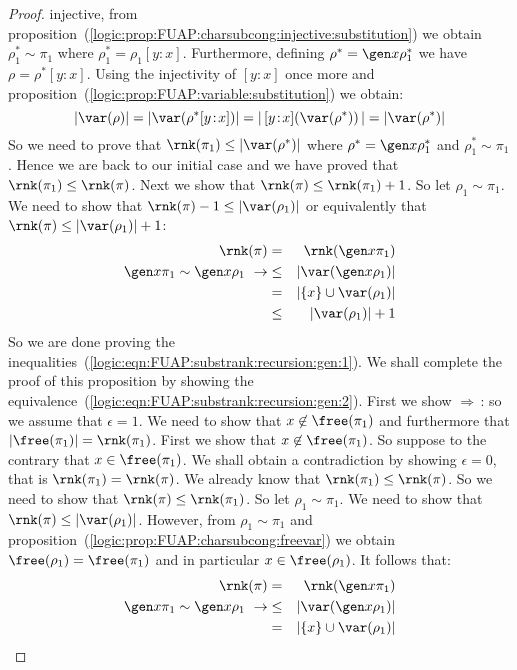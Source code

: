 \begin{proof}
injective, from
proposition~(\ref{logic:prop:FUAP:charsubcong:injective:substitution})
we obtain $\rho_{1}^{*}\sim\pi_{1}$ where
$\rho_{1}^{*}=\rho_{1}[y\!:\!x]$. Furthermore, defining
$\rho^{*}=\gen x\rho_{1}^{*}$ we have $\rho=\rho^{*}[y\!:\!x]$.
Using the injectivity of $[y\!:\!x]$ once more and
proposition~(\ref{logic:prop:FUAP:variable:substitution}) we obtain:
    \[
    |\var(\rho)|=|\var(\rho^{*}[y\!:\!x])|=
    |\,[y\!:\!x](\var(\rho^{*}))\,|=|\var(\rho^{*})|
    \]
So we need to prove that $\rnk(\pi_{1})\leq|\var(\rho^{*})|$ where
$\rho^{*}=\gen x\rho_{1}^{*}$ and $\rho_{1}^{*}\sim\pi_{1}$. Hence
we are back to our initial case and we have proved that
$\rnk(\pi_{1})\leq\rnk(\pi)$. Next we show that
$\rnk(\pi)\leq\rnk(\pi_{1})+1$. So let $\rho_{1}\sim\pi_{1}$. We
need to show that $\rnk(\pi)-1\leq|\var(\rho_{1})|$ or equivalently
that $\rnk(\pi)\leq|\var(\rho_{1})|+1$:
    \begin{eqnarray*}
    \rnk(\pi)&=&\rnk(\gen x\pi_{1})\\
    \gen x\pi_{1}\sim\gen x\rho_{1}\ \rightarrow
    &\leq&|\var(\gen x\rho_{1})|\\
    &=&|\{x\}\cup\var(\rho_{1})|\\
    &\leq&|\var(\rho_{1})|+1
    \end{eqnarray*}
So we are done proving the
inequalities~(\ref{logic:eqn:FUAP:substrank:recursion:gen:1}). We
shall complete the proof of this proposition by showing the
equivalence~(\ref{logic:eqn:FUAP:substrank:recursion:gen:2}). First
we show $\Rightarrow$\,: so we assume that $\epsilon=1$. We need to
show that $x\not\in\free(\pi_{1})$ and furthermore that
$|\free(\pi_{1})|=\rnk(\pi_{1})$. First we show that
$x\not\in\free(\pi_{1})$. So suppose to the contrary that
$x\in\free(\pi_{1})$. We shall obtain a contradiction by showing
$\epsilon=0$, that is $\rnk(\pi_{1})=\rnk(\pi)$. We already know
that $\rnk(\pi_{1})\leq\rnk(\pi)$. So we need to show that
$\rnk(\pi)\leq\rnk(\pi_{1})$. So let $\rho_{1}\sim\pi_{1}$. We need
to show that $\rnk(\pi)\leq|\var(\rho_{1})|$. However, from
$\rho_{1}\sim\pi_{1}$ and
proposition~(\ref{logic:prop:FUAP:charsubcong:freevar}) we obtain
$\free(\rho_{1})=\free(\pi_{1})$ and in particular
$x\in\free(\rho_{1})$. It follows that:
    \begin{eqnarray*}
    \rnk(\pi)&=&\rnk(\gen x\pi_{1})\\
    \gen x\pi_{1}\sim\gen x\rho_{1}\ \rightarrow
    &\leq&|\var(\gen x\rho_{1})|\\
    &=&|\{x\}\cup\var(\rho_{1})|\\

\end{eqnarray*}
\end{proof}
